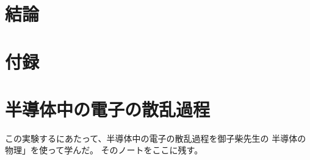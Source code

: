 \documentclass[11pt,dvipdfmx,a4paper]{jsarticle}
\numberwithin{equation}{section}
\begin{document}
\section{結論}




\section*{付録}
\section{半導体中の電子の散乱過程}
この実験するにあたって、半導体中の電子の散乱過程を御子柴先生の
半導体の物理」\cite{Mikoshiba}を使って学んだ。
そのノートをここに残す。
\end{document}
